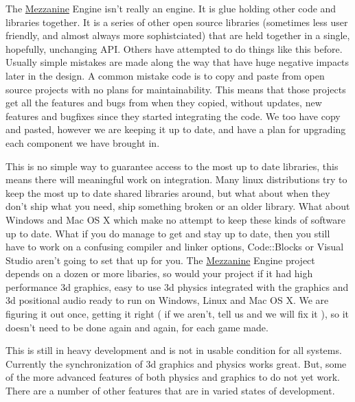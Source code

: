 The \hyperlink{namespaceMezzanine}{Mezzanine} Engine isn't really an engine. It is glue holding other code and libraries together. It is a series of other open source libraries (sometimes less user friendly, and almost always more sophistciated) that are held together in a single, hopefully, unchanging API. Others have attempted to do things like this before. Usually simple mistakes are made along the way that have huge negative impacts later in the design. A common mistake code is to copy and paste from open source projects with no plans for maintainability. This means that those projects get all the features and bugs from when they copied, without updates, new features and bugfixes since they started integrating the code. We too have copy and pasted, however we are keeping it up to date, and have a plan for upgrading each component we have brought in.

This is no simple way to guarantee access to the most up to date libraries, this means there will meaningful work on integration. Many linux distributions try to keep the most up to date shared libraries around, but what about when they don't ship what you need, ship something broken or an older library. What about Windows and Mac OS X which make no attempt to keep these kinds of software up to date. What if you do manage to get and stay up to date, then you still have to work on a confusing compiler and linker options, Code::Blocks or Visual Studio aren't going to set that up for you. The \hyperlink{namespaceMezzanine}{Mezzanine} Engine project depends on a dozen or more libaries, so would your project if it had high performance 3d graphics, easy to use 3d physics integrated with the graphics and 3d positional audio ready to run on Windows, Linux and Mac OS X. We are figuring it out once, getting it right ( if we aren't, tell us and we will fix it ), so it doesn't need to be done again and again, for each game made.

This is still in heavy development and is not in usable condition for all systems. Currently the synchronization of 3d graphics and physics works great. But, some of the more advanced features of both physics and graphics to do not yet work. There are a number of other features that are in varied states of development.

